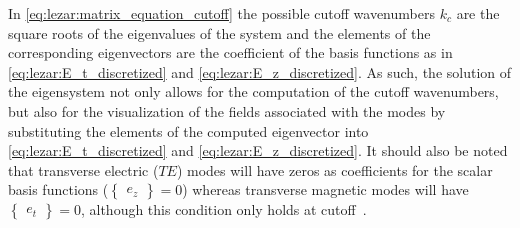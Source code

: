 In \eqref{eq:lezar:matrix_equation_cutoff} the possible cutoff wavenumbers $k_c$ are the square roots of the eigenvalues of the system and the elements of the corresponding eigenvectors are the coefficient of the basis functions as in \eqref{eq:lezar:E_t_discretized} and \eqref{eq:lezar:E_z_discretized}. As such, the solution of the eigensystem not only allows for the computation of the cutoff wavenumbers, but also for the visualization of the fields associated with the modes by substituting the elements of the computed eigenvector into \eqref{eq:lezar:E_t_discretized} and \eqref{eq:lezar:E_z_discretized}. It should also be noted that transverse electric ($TE$) modes will have zeros as coefficients for the scalar basis functions ($\begin{Bmatrix}e_z\end{Bmatrix} = 0$) whereas transverse magnetic modes will have $\begin{Bmatrix}e_t\end{Bmatrix} = 0$, although this condition only holds at cutoff~\citep{Pozar2005}.


